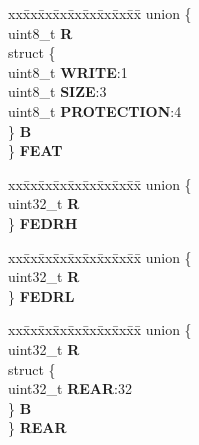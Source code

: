 \begin{DoxyCompactItemize}
\begin{tabbing}
\end{tabbing}\item 
\mbox{\label{structMCM__tag_a77199c9d39bf40f03b01166b57ea5a3b}} 
\begin{tabbing}
xx\=xx\=xx\=xx\=xx\=xx\=xx\=xx\=xx\=\kill
union \{\\
\>uint8\_t {\bfseries R}\\
\>struct \{\\
\>\>uint8\_t {\bfseries WRITE}:1\\
\>\>uint8\_t {\bfseries SIZE}:3\\
\>\>uint8\_t {\bfseries PROTECTION}:4\\
\>\} {\bfseries B}\\
\} {\bfseries FEAT}\\

\end{tabbing}\item 
\mbox{\label{structMCM__tag_a9c643faf2831ab9a406bcc99568b730a}} 
\begin{tabbing}
xx\=xx\=xx\=xx\=xx\=xx\=xx\=xx\=xx\=\kill
union \{\\
\>uint32\_t {\bfseries R}\\
\} {\bfseries FEDRH}\\

\end{tabbing}\item 
\mbox{\label{structMCM__tag_a8472ea385633a560d3f1eff285041a5f}} 
\begin{tabbing}
xx\=xx\=xx\=xx\=xx\=xx\=xx\=xx\=xx\=\kill
union \{\\
\>uint32\_t {\bfseries R}\\
\} {\bfseries FEDRL}\\

\end{tabbing}\item 
\mbox{\label{structMCM__tag_afca06f72075a321c44e742306a4725a1}} 
\begin{tabbing}
xx\=xx\=xx\=xx\=xx\=xx\=xx\=xx\=xx\=\kill
union \{\\
\>uint32\_t {\bfseries R}\\
\>struct \{\\
\>\>uint32\_t {\bfseries REAR}:32\\
\>\} {\bfseries B}\\
\} {\bfseries REAR}\\


\end{tabbing}
\end{DoxyCompactItemize}
